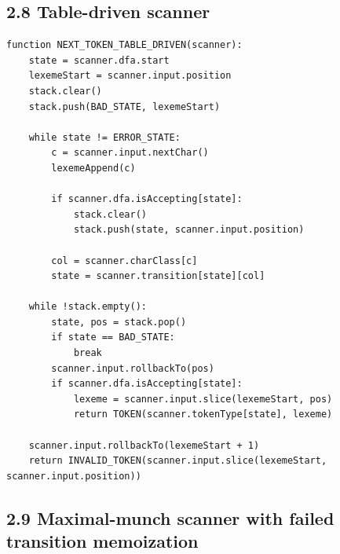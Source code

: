 \documentclass[10pt,letterpaper]{article}
\begin{document}
\subsection*{2.8 Table-driven scanner}

\begin{verbatim}
function NEXT_TOKEN_TABLE_DRIVEN(scanner):
    state = scanner.dfa.start
    lexemeStart = scanner.input.position
    stack.clear()
    stack.push(BAD_STATE, lexemeStart)

    while state != ERROR_STATE:
        c = scanner.input.nextChar()
        lexemeAppend(c)

        if scanner.dfa.isAccepting[state]:
            stack.clear()
            stack.push(state, scanner.input.position)

        col = scanner.charClass[c]
        state = scanner.transition[state][col]

    while !stack.empty():
        state, pos = stack.pop()
        if state == BAD_STATE:
            break
        scanner.input.rollbackTo(pos)
        if scanner.dfa.isAccepting[state]:
            lexeme = scanner.input.slice(lexemeStart, pos)
            return TOKEN(scanner.tokenType[state], lexeme)

    scanner.input.rollbackTo(lexemeStart + 1)
    return INVALID_TOKEN(scanner.input.slice(lexemeStart, scanner.input.position))
\end{verbatim}

\subsection*{2.9 Maximal-munch scanner with failed transition memoization}
\end{document}
